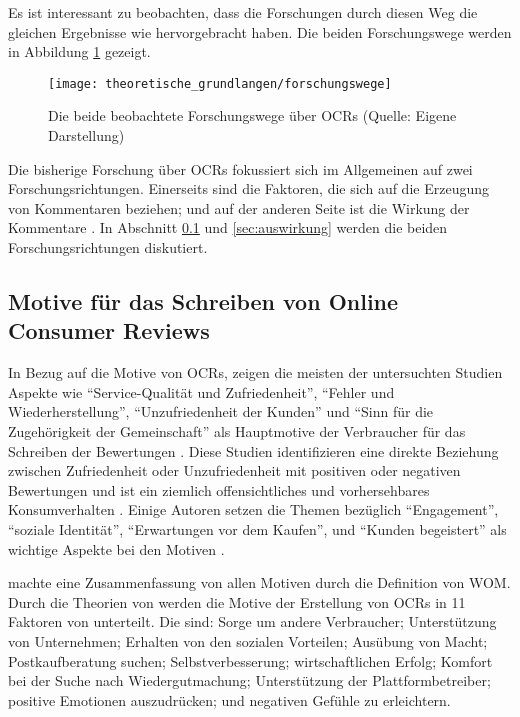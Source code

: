 Es ist interessant zu beobachten, dass die Forschungen durch diesen Weg die gleichen Ergebnisse wie \citet{duhan1997influences, Hong2011} hervorgebracht haben. Die beiden Forschungswege werden in Abbildung \ref{fig:forschungswege} gezeigt.
\begin{figure}[htb]
	\begin{center}
		\texttt{[image: theoretische\_grundlangen/forschungswege]}
		\caption[Die beiden beobachteten Forschungswege über OCRs]{Die beide beobachtete Forschungswege über \ac{OCRs} (Quelle: Eigene Darstellung)}
		\label{fig:forschungswege}
	\end{center}
\end{figure}

Die bisherige Forschung über \ac{OCRs} fokussiert sich im Allgemeinen auf zwei Forschungsrichtungen. Einerseits sind die Faktoren, die sich auf die Erzeugung von Kommentaren beziehen; und auf der anderen Seite ist die Wirkung der Kommentare \citep{SerraCantallops2014}. In Abschnitt \ref{sec:erzeugungsfaktoren} und \ref{sec:auswirkung} werden die beiden Forschungsrichtungen diskutiert.
\subsection{Motive für das Schreiben von Online Consumer Reviews} \label{sec:erzeugungsfaktoren}
In Bezug auf die Motive von \ac{OCRs}, zeigen die meisten der untersuchten Studien Aspekte wie ``Service-Qualität und Zufriedenheit'', ``Fehler und Wiederherstellung'', ``Unzufriedenheit der Kunden'' und ``Sinn für die Zugehörigkeit der Gemeinschaft'' als Hauptmotive der Verbraucher für das Schreiben der Bewertungen \citep{Swanson2009critical, Kim200951, Sun2011isthere, SanchezGarcia20111397, Nusair2011833}. Diese Studien identifizieren eine direkte Beziehung zwischen Zufriedenheit oder Unzufriedenheit mit positiven oder negativen Bewertungen und ist ein ziemlich offensichtliches und vorhersehbares Konsumverhalten \citep{SerraCantallops2014}. Einige Autoren setzen die Themen bezüglich ``Engagement'', ``soziale Identität'', ``Erwartungen vor dem Kaufen'', und ``Kunden begeistert'' als wichtige Aspekte bei den Motiven \citep{crotts2009measuring, Casalo2010898, bronner2010vacationers}.

\citet{Hennig-Thurau2004a} machte eine Zusammenfassung von allen Motiven durch die Definition von \ac{WOM}. Durch die Theorien von \citet{dichter1966word, engel1993consumer, sundaram1998word} werden die Motive der Erstellung von \ac{OCRs} in 11 Faktoren von \citeauthor{Hennig-Thurau2004a} unterteilt. Die sind: Sorge um andere Verbraucher; Unterstützung von Unternehmen; Erhalten von den sozialen Vorteilen; Ausübung von Macht; Postkaufberatung suchen; Selbstverbesserung; wirtschaftlichen Erfolg; Komfort bei der Suche nach Wiedergutmachung; Unterstützung der Plattformbetreiber; positive Emotionen auszudrücken; und negativen Gefühle zu erleichtern.

